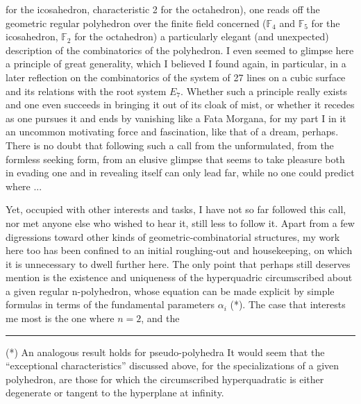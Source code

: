 
for the icosahedron, characteristic 2 for the octahedron), one reads
off the geometric regular polyhedron over the finite field concerned
($\mathbb{F}_4$ and $\mathbb{F}_5$ for the icosahedron, $\mathbb{F}_2$ for the octahedron) a particularly
elegant (and unexpected) description of the combinatorics
of the polyhedron. I even seemed to glimpse here a principle
of great generality, which I believed I found again, in particular, in
a later reflection on the combinatorics of the system of 27
lines on a cubic surface and its relations with the root
system $E_7$. Whether such a principle really exists and one
even succeeds in bringing it out of its cloak of mist, or whether it
recedes as one pursues it and ends by
vanishing like a Fata Morgana,
for my part I 
in it an uncommon motivating force and fascination,
like that of a dream, perhaps. There is no doubt that following such a call from the
unformulated, from the formless seeking form, from an elusive
glimpse that seems to take pleasure both in evading one and in
revealing itself can only lead far, while no one could
predict where ...

Yet, occupied with other interests and tasks, I have
not so far followed this call, nor met anyone else
who wished to hear it, still less to follow it. Apart from
a few digressions toward other kinds of geometric-combinatorial
structures, my work here too has been confined to an initial
roughing-out and housekeeping, on which it is unnecessary
to dwell further here. The only point that perhaps still deserves
mention is the existence and uniqueness of the hyperquadric circumscribed
about a given regular n-polyhedron, whose equation can be made
explicit by simple formulas in terms of the fundamental parameters
$\alpha_i$ (*). The case that interests me most is the one where $n = 2$, and the

\rule{5cm}{0.4pt}

(*) An analogous result holds for pseudo-polyhedra It would seem
that the ``exceptional characteristics'' discussed above,
for the specializations of a given polyhedron, are those for
which the circumscribed hyperquadratic is either degenerate or
tangent to the hyperplane at infinity.


